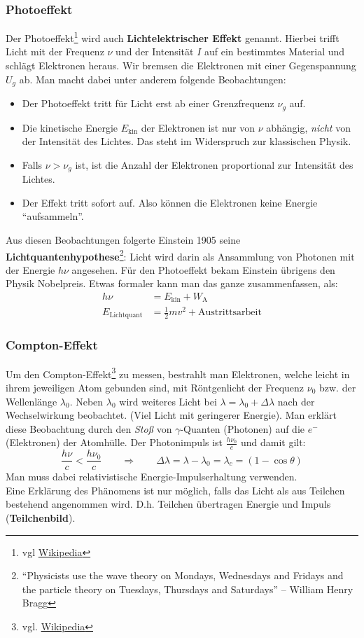 \subsubsection{Photoeffekt} Der Photoeffekt\footnote{vgl \href{https://de.wikipedia.org/wiki/Photoelektrischer_Effekt}{Wikipedia}} wird auch \textbf{Lichtelektrischer Effekt} genannt. Hierbei trifft Licht mit der Frequenz $\nu$ und der Intensität $I$ auf ein bestimmtes Material und schlägt Elektronen heraus. Wir bremsen die Elektronen mit einer Gegenspannung $U_g$ ab. Man macht dabei unter anderem folgende Beobachtungen:
\begin{itemize}
	\item Der Photoeffekt tritt für Licht erst ab einer Grenzfrequenz $\nu_g$ auf.
	\item Die kinetische Energie $E_\text{kin}$ der Elektronen ist nur von $\nu$ abhängig, \emph{nicht} von der Intensität des Lichtes. Das steht im Widerspruch zur klassischen Physik.
	\item Falls $\nu > \nu_g$ ist, ist die Anzahl der Elektronen proportional zur Intensität des Lichtes.
	\item Der Effekt tritt sofort auf. Also können die Elektronen keine Energie "`aufsammeln"'.
\end{itemize}
Aus diesen Beobachtungen folgerte Einstein 1905 seine \textbf{Lichtquantenhypothese}\footnote{"`Physicists use the wave theory on Mondays, Wednesdays and Fridays and the particle theory on Tuesdays, Thursdays and Saturdays"' – William Henry Bragg}: Licht wird darin als Ansammlung von Photonen mit der Energie $h \nu$ angesehen. Für den Photoeffekt bekam Einstein übrigens den Physik Nobelpreis. Etwas formaler kann man das ganze zusammenfassen, als:
\begin{align*}
h \nu &= E_\text{kin} + W_\text{A}\\
E_\text{Lichtquant} &= \frac12 m v^2 + \text{Austrittsarbeit}
\end{align*}

\subsubsection{Compton-Effekt}
Um den Compton-Effekt\footnote{vgl. \href{https://de.wikipedia.org/wiki/Compton-Effekt}{Wikipedia}} zu messen, bestrahlt man  Elektronen, welche leicht in ihrem jeweiligen Atom gebunden sind, mit Röntgenlicht der Frequenz $\nu_0$ bzw. der Wellenlänge $\lambda_0$. Neben $\lambda_0$ wird weiteres Licht bei $\lambda = \lambda_0 + \Delta \lambda$ nach der Wechselwirkung beobachtet. (Viel Licht mit geringerer Energie). Man erklärt diese Beobachtung durch den \emph{Stoß} von $\gamma$-Quanten (Photonen) auf die $e^-$ (Elektronen) der Atomhülle.
Der Photonimpuls ist $\frac{h \nu_0}{c}$ und damit gilt:
$$\frac{h \nu}{c} < \frac{h \nu_0}{c} \qquad \Rightarrow \qquad \Delta \lambda = \lambda - \lambda_0 = \lambda_c = (1 - \cos \theta)$$
Man muss dabei relativistische Energie-Impulserhaltung verwenden.\\
Eine Erklärung des Phänomens ist nur möglich, falls das Licht als aus Teilchen bestehend angenommen wird. D.h. Teilchen übertragen Energie und Impuls (\textbf{Teilchenbild}).

